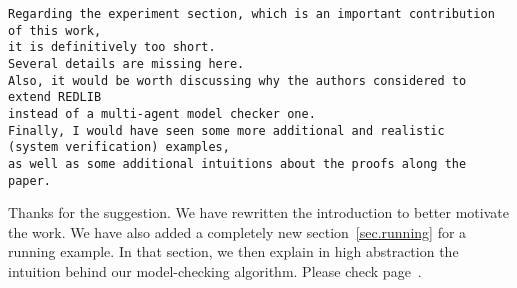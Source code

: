 \documentclass[11pt]{article}
\newcounter{cabbage1}
\newcounter{cabbage2}
\newcounter{cabbage3}
\newcounter{bean1}
\newcounter{bean2}
\newcounter{bean3}
\newcounter{bean4}
\newcounter{bean5}
\newcounter{bean6}
\newenvironment{reply3}{\begin{list}{\bf (Reply 3.\arabic{bean3}):} 
        {\usecounter{bean3}\setcounter{bean3}{\value{cabbage3}} 
        \item \setcounter{cabbage3}{\value{bean3}} 
        }
}{\end{list}}
\begin{document}
\begin{verbatim} 
Regarding the experiment section, which is an important contribution of this work, 
it is definitively too short. 
Several details are missing here. 
Also, it would be worth discussing why the authors considered to extend REDLIB 
instead of a multi-agent model checker one. 
Finally, I would have seen some more additional and realistic 
(system verification) examples, 
as well as some additional intuitions about the proofs along the paper. 
\end{verbatim} 
\begin{reply3} 
Thanks for the suggestion. 
We have rewritten the introduction to better motivate the work. 
We have also added a completely new section~\ref{sec.running} for a 
running example.  
In that section, we then explain in high abstraction the intuition behind our model-checking algorithm.   
Please check page~\pageref{sec.relwork}.   
\end{reply3} 
\end{document}
